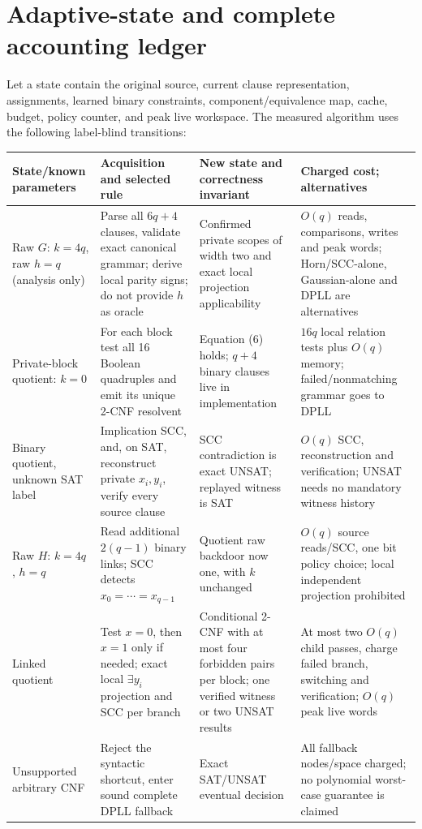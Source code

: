 \documentclass[11pt]{article}
\begin{document}
\section{Adaptive-state and complete accounting ledger}
Let a state contain the original source, current clause
representation, assignments, learned binary constraints,
component/equivalence map, cache, budget, policy counter,
and peak live workspace. The measured algorithm uses
the following label-blind transitions:
\begin{center}\small
\begin{tabular}{p{.18\linewidth}p{.21\linewidth}p{.22\linewidth}p{.24\linewidth}}
\toprule
State/known parameters & Acquisition and selected rule &
New state and correctness invariant & Charged cost; alternatives\\\midrule
Raw $G$: $k=4q$, raw $h=q$ (analysis only) &
Parse all $6q+4$ clauses, validate exact canonical grammar;
derive local parity signs; do not provide $h$ as oracle &
Confirmed private scopes of width two and exact local
projection applicability &
$O(q)$ reads, comparisons, writes and peak words;
Horn/SCC-alone, Gaussian-alone and DPLL are alternatives\\
Private-block quotient: $k=0$ &
For each block test all 16 Boolean quadruples and
emit its unique 2-CNF resolvent &
Equation (6) holds; $q+4$ binary clauses live
in implementation &
$16q$ local relation tests plus $O(q)$ memory;
failed/nonmatching grammar goes to DPLL\\
Binary quotient, unknown SAT label &
Implication SCC, and, on SAT, reconstruct private
$x_i,y_i$, verify every source clause &
SCC contradiction is exact UNSAT; replayed witness is SAT &
$O(q)$ SCC, reconstruction and verification;
UNSAT needs no mandatory witness history\\
Raw $H$: $k=4q$, $h=q$ &
Read additional $2(q-1)$ binary links; SCC detects
$x_0=\cdots=x_{q-1}$ &
Quotient raw backdoor now one, with $k$ unchanged &
$O(q)$ source reads/SCC, one bit policy choice;
local independent projection prohibited\\
Linked quotient &
Test $x=0$, then $x=1$ only if needed; exact local
$\exists y_i$ projection and SCC per branch &
Conditional 2-CNF with at most four forbidden pairs
per block; one verified witness or two UNSAT results &
At most two $O(q)$ child passes, charge failed branch,
switching and verification; $O(q)$ peak live words\\
Unsupported arbitrary CNF &
Reject the syntactic shortcut, enter sound complete
DPLL fallback &
Exact SAT/UNSAT eventual decision &
All fallback nodes/space charged; no polynomial
worst-case guarantee is claimed\\
\bottomrule
\end{tabular}
\end{center}
\end{document}
